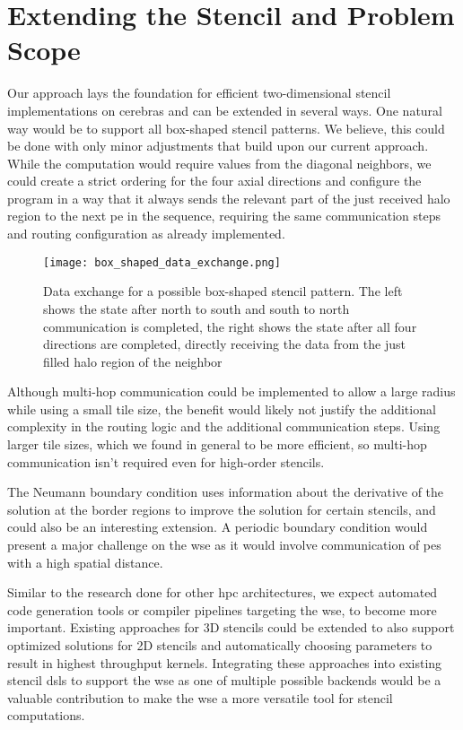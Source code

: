 \section{Extending the Stencil and Problem Scope}
Our approach lays the foundation for efficient two-dimensional stencil implementations on cerebras and can be extended in several ways.
One natural way would be to support all box-shaped stencil patterns.
We believe, this could be done with only minor adjustments that build upon our current approach.
While the computation would require values from the diagonal neighbors, we could create a strict ordering for the four axial directions and configure the program in a way that it always sends the relevant part of the just received halo region to the next \ac{pe} in the sequence, requiring the same communication steps and routing configuration as already implemented.

\begin{figure}[h]
    \centering
    \texttt{[image: box\_shaped\_data\_exchange.png]}
    \caption{Data exchange for a possible box-shaped stencil pattern. The left shows the state after north to south and south to north communication is completed, the right shows the state after all four directions are completed, directly receiving the data from the just filled halo region of the neighbor}
    \label{fig:data_exchange_box_shaped}
\end{figure}

Although multi-hop communication could be implemented to allow a large radius while using a small tile size, the benefit would likely not justify the additional complexity in the routing logic and the additional communication steps. Using larger tile sizes, which we found in general to be more efficient, so multi-hop communication isn't required even for high-order stencils.

The Neumann boundary condition uses information about the derivative of the solution at the border regions to improve the solution for certain stencils, and could also be an interesting extension. A periodic boundary condition would present a major challenge on the \ac{wse} as it would involve communication of \acp{pe} with a high spatial distance. 

Similar to the research done for other \ac{hpc} architectures, we expect automated code generation tools or compiler pipelines targeting the \ac{wse}, to become more important.
Existing approaches for 3D stencils\cite{sai2024automated} could be extended to also support optimized solutions for 2D stencils and automatically choosing parameters to result in highest throughput kernels.
Integrating these approaches into existing stencil \acp{dsl} to support the \ac{wse} as one of multiple possible backends would be a valuable contribution to make the \ac{wse} a more versatile tool for stencil computations.